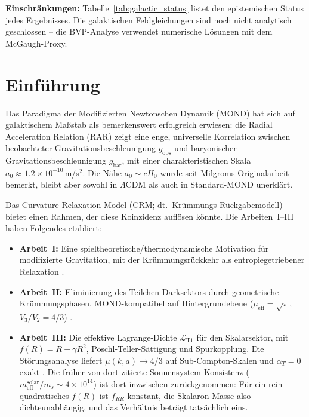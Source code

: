 \documentclass[aps,prd,twocolumn,superscriptaddress,nofootinbib]{revtex4-2}
\begin{document}
\textbf{Einschr\"ankungen:} Tabelle~\ref{tab:galactic_status} listet den epistemischen Status jedes Ergebnisses. Die galaktischen Feldgleichungen sind noch nicht analytisch geschlossen -- die BVP-Analyse verwendet numerische L\"osungen mit dem McGaugh-Proxy.


\section{Einführung}
\label{sec:intro}

Das Paradigma der Modifizierten Newtonschen Dynamik (MOND) \cite{Milgrom1983} hat sich auf galaktischem Ma\ss{}stab als bemerkenswert erfolgreich erwiesen: die Radial Acceleration Relation (RAR) \cite{McGaugh2016} zeigt eine enge, universelle Korrelation zwischen beobachteter Gravitationsbeschleunigung $g_{\mathrm{obs}}$ und baryonischer Gravitationsbeschleunigung $g_{\mathrm{bar}}$, mit einer charakteristischen Skala $a_0 \approx 1.2 \times 10^{-10}$\,m/s$^2$. Die N\"ahe $a_0 \sim cH_0$ wurde seit Milgroms Originalarbeit bemerkt, bleibt aber sowohl in $\Lambda$CDM als auch in Standard-MOND unerkl\"art.

Das Curvature Relaxation Model (CRM; dt.\ Kr\"ummungs-R\"uckgabemodell) bietet einen Rahmen, der diese Koinzidenz aufl\"osen k\"onnte. Die Arbeiten~I--III \cite{Geiger2026,Geiger2026b,Geiger2026c} haben Folgendes etabliert:
\begin{itemize}
\item \textbf{Arbeit~I:} Eine spieltheoretische/thermodynamische Motivation f\"ur modifizierte Gravitation, mit der Kr\"ummungsr\"uckkehr als entropiegetriebener Relaxation \cite{Geiger2026}.
\item \textbf{Arbeit~II:} Eliminierung des Teilchen-Darksektors durch geometrische Kr\"ummungsphasen, MOND-kompatibel auf Hintergrundebene ($\mu_{\mathrm{eff}} = \sqrt{\pi}$, $V_3/V_2 = 4/3$) \cite{Geiger2026b}.
\item \textbf{Arbeit~III:} Die effektive Lagrange-Dichte $\mathcal{L}_{\mathrm{T1}}$ f\"ur den Skalarsektor, mit $f(R) = R + \gamma R^2$, P\"oschl-Teller-S\"attigung und Spurkopplung. Die St\"orungsanalyse liefert $\mu(k,a) \to 4/3$ auf Sub-Compton-Skalen und $\alpha_T = 0$ exakt \cite{Geiger2026c}. Die fr\"uher von dort zitierte Sonnensystem-Konsistenz ($m_{\mathrm{eff}}^{\mathrm{solar}}/m_s \sim 4 \times 10^{14}$) ist dort inzwischen zur\"uckgenommen: F\"ur ein rein quadratisches $f(R)$ ist $f_{RR}$ konstant, die Skalaron-Masse also dichteunabh\"angig, und das Verh\"altnis betr\"agt tats\"achlich eins.
\end{itemize}
\end{document}
